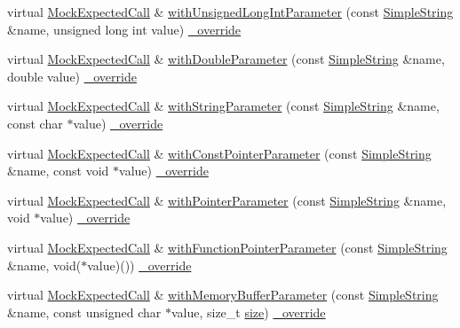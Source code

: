 \begin{DoxyCompactItemize}
\item 
virtual \hyperlink{class_mock_expected_call}{Mock\+Expected\+Call} \& \hyperlink{class_mock_expected_call_composite_a7da86441ae351a1a81b1093176fe75cd}{with\+Unsigned\+Long\+Int\+Parameter} (const \hyperlink{class_simple_string}{Simple\+String} \&name, unsigned long int value) \hyperlink{_cpp_u_test_config_8h_a049bea15dd750e15869863c94c1efc3b}{\+\_\+override}
\item 
virtual \hyperlink{class_mock_expected_call}{Mock\+Expected\+Call} \& \hyperlink{class_mock_expected_call_composite_a5be4704cfa6d286196a59e90c4a8eee9}{with\+Double\+Parameter} (const \hyperlink{class_simple_string}{Simple\+String} \&name, double value) \hyperlink{_cpp_u_test_config_8h_a049bea15dd750e15869863c94c1efc3b}{\+\_\+override}
\item 
virtual \hyperlink{class_mock_expected_call}{Mock\+Expected\+Call} \& \hyperlink{class_mock_expected_call_composite_abf23d0df1cd0401698a2642e3552f064}{with\+String\+Parameter} (const \hyperlink{class_simple_string}{Simple\+String} \&name, const char $\ast$value) \hyperlink{_cpp_u_test_config_8h_a049bea15dd750e15869863c94c1efc3b}{\+\_\+override}
\item 
virtual \hyperlink{class_mock_expected_call}{Mock\+Expected\+Call} \& \hyperlink{class_mock_expected_call_composite_a44bd05d79bd9a6782cf39e897eb6db1e}{with\+Const\+Pointer\+Parameter} (const \hyperlink{class_simple_string}{Simple\+String} \&name, const void $\ast$value) \hyperlink{_cpp_u_test_config_8h_a049bea15dd750e15869863c94c1efc3b}{\+\_\+override}
\item 
virtual \hyperlink{class_mock_expected_call}{Mock\+Expected\+Call} \& \hyperlink{class_mock_expected_call_composite_a39c1335f3e364291df78953e324cf3ab}{with\+Pointer\+Parameter} (const \hyperlink{class_simple_string}{Simple\+String} \&name, void $\ast$value) \hyperlink{_cpp_u_test_config_8h_a049bea15dd750e15869863c94c1efc3b}{\+\_\+override}
\item 
virtual \hyperlink{class_mock_expected_call}{Mock\+Expected\+Call} \& \hyperlink{class_mock_expected_call_composite_abecba955304747178e8c6c52a49f4785}{with\+Function\+Pointer\+Parameter} (const \hyperlink{class_simple_string}{Simple\+String} \&name, void($\ast$value)()) \hyperlink{_cpp_u_test_config_8h_a049bea15dd750e15869863c94c1efc3b}{\+\_\+override}
\item 
virtual \hyperlink{class_mock_expected_call}{Mock\+Expected\+Call} \& \hyperlink{class_mock_expected_call_composite_a54587b94a8325e2fca1a721888f398fc}{with\+Memory\+Buffer\+Parameter} (const \hyperlink{class_simple_string}{Simple\+String} \&name, const unsigned char $\ast$value, size\+\_\+t \hyperlink{gst__avb__playbin_8c_a439227feff9d7f55384e8780cfc2eb82}{size}) \hyperlink{_cpp_u_test_config_8h_a049bea15dd750e15869863c94c1efc3b}{\+\_\+override}

\end{DoxyCompactItemize}
